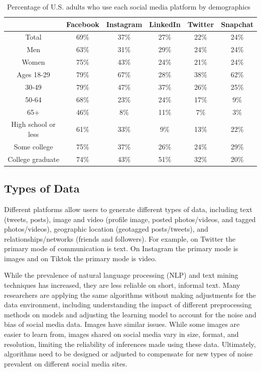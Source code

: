 \documentclass[11pt]{article} %
\begin{document}
\begin{table}[h]
\small
\centering
\caption{Percentage of U.S. adults who use each social media platform by demographics~\cite{sm_demo} }
\label{table:platform-demographics}
\begin{tabular}{cccccc}
\toprule
                      & Facebook & Instagram & LinkedIn & Twitter & Snapchat \\ \midrule
Total                 & 69\%     & 37\%      & 27\%     & 22\%    & 24\%     \\ \midrule
Men                   & 63\%     & 31\%      & 29\%     & 24\%    & 24\% \\ 
Women                 & 75\%     & 43\%      & 24\%     & 21\%    & 24\% \\ \midrule
Ages 18-29          & 79\%     & 67\%      & 28\%     & 38\%    & 62\% \\ 
30-49                 & 79\%     & 47\%      & 37\%     & 26\%    & 25\% \\ 
50-64                 & 68\%     & 23\%      & 24\%     & 17\%    & 9\% \\ 
65+                   & 46\%     & 8\%       & 11\%     & 7\%     & 3\% \\ \midrule
High school or less & 61\%     & 33\%      & 9\%      & 13\%    & 22\%       \\ 
Some college        & 75\%     & 37\%      & 26\%     & 24\%    & 29\%       \\ 
College graduate    & 74\%     & 43\%      & 51\%     & 32\%    & 20\%       \\ \bottomrule
\end{tabular}
\end{table}





\subsection{Types of Data}
Different platforms allow users to generate different types of data, including text (tweets, posts), image and video (profile image, posted photos/videos, and tagged photos/videos), geographic location (geotagged posts/tweets), and relationships/networks (friends and followers). For example, on Twitter the primary mode of communication is text. On Instagram the primary mode is images and on Tiktok the primary mode is video. 

While the prevalence of natural language processing (NLP) and text mining techniques has increased, they are less reliable on short, informal text. Many researchers are applying the same algorithms without making adjustments for the data environment, including understanding the impact of different preprocessing methods on models and adjusting the learning model to account for the noise and bias of social media data. Images have similar issues. While some images are easier to learn from, images shared on social media vary in size, format, and resolution, limiting the reliability of inferences made using these data. Ultimately, algorithms need to be designed or adjusted to compensate for new types of noise prevalent on different social media sites. 
\end{document}
